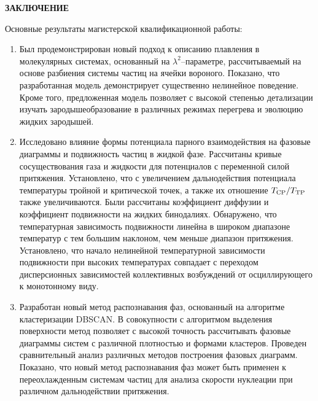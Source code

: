 \newpage
\begin{center}
\textbf{\large ЗАКЛЮЧЕНИЕ}
\end{center}


Основные результаты магистерской квалификационной работы:
\begin{enumerate}

    \item Был продемонстрирован новый подход к описанию плавления в молекулярных системах, основанный на $\lambda^2$--параметре, рассчитываемый на основе разбиения системы частиц на ячейки вороного. Показано, что разработанная модель демонстрирует существенно нелинейное поведение. Кроме того, предложенная модель позволяет с высокой степенью детализации изучать зародышеобразование в различных режимах перегрева и эволюцию жидких зародышей.

    \item Исследовано влияние формы потенциала парного взаимодействия на фазовые диаграммы и подвижность частиц в жидкой фазе. Рассчитаны кривые сосуществования газа и жидкости для потенциалов с переменной силой притяжения. Установлено, что с увеличением дальнодействия потенциала температуры тройной и критической точек, а также их отношение $T_{\rm CP}/T_{\rm TP}$ также увеличиваются. Были рассчитаны коэффициент диффузии и коэффициент подвижности на жидких бинодалиях. Обнаружено, что температурная зависимость подвижности линейна в широком диапазоне температур с тем большим наклоном, чем меньше диапазон притяжения. Установлено, что начало нелинейной температурной зависимости подвижности при высоких температурах совпадает с переходом дисперсионных зависимостей коллективных возбуждений от осциллирующего к монотонному виду.

    \item Разработан новый метод распознавания фаз, основанный на алгоритме кластеризации DBSCAN. В совокупности с алгоритмом выделения поверхности метод позволяет с высокой точность рассчитывать фазовые диаграммы систем с различной плотностью и формами кластеров. Проведен сравнительный анализ различных методов построения фазовых диаграмм. Показано, что новый метод распознавания фаз может быть применен к переохлажденным системам частиц для анализа скорости нуклеации при различном дальнодействии притяжения.

\end{enumerate}
